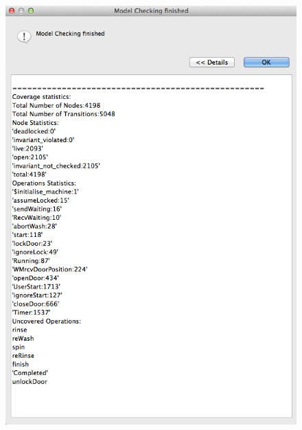 \begin{figure}[!htbp]
  \centering
  \ifplastex
  \includegraphics[width=1024]{figures/image33.png}
  \else

\end{figure}

